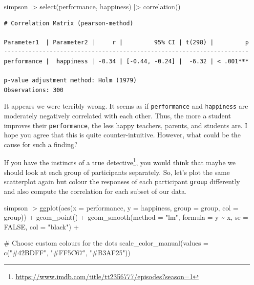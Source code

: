 \documentclass[
  letterpaper,
]{krantz}
\makeatletter
\newenvironment{Shaded}{\begin{snugshade}}{\end{snugshade}}
\newcommand{\AttributeTok}[1]{\textcolor[rgb]{0.40,0.45,0.13}{#1}}
\newcommand{\CommentTok}[1]{\textcolor[rgb]{0.37,0.37,0.37}{#1}}
\newcommand{\ConstantTok}[1]{\textcolor[rgb]{0.56,0.35,0.01}{#1}}
\newcommand{\FunctionTok}[1]{\textcolor[rgb]{0.28,0.35,0.67}{#1}}
\newcommand{\NormalTok}[1]{\textcolor[rgb]{0.00,0.23,0.31}{#1}}
\newcommand{\SpecialCharTok}[1]{\textcolor[rgb]{0.37,0.37,0.37}{#1}}
\newcommand{\StringTok}[1]{\textcolor[rgb]{0.13,0.47,0.30}{#1}}
\renewcommand{\href}[2]{#2\footnote{\url{#1}}}
\newenvironment{kframe}{%
\medskip{}
\setlength{\fboxsep}{.8em}
 \def\at@end@of@kframe{}%
 \ifinner\ifhmode%
  \def\at@end@of@kframe{\end{minipage}}%
  \begin{minipage}{\columnwidth}%
 \fi\fi%
 \def\FrameCommand##1{\hskip\@totalleftmargin \hskip-\fboxsep
 \colorbox{shadecolor}{##1}\hskip-\fboxsep
     \hskip-\linewidth \hskip-\@totalleftmargin \hskip\columnwidth}%
 \MakeFramed {\advance\hsize-\width
   \@totalleftmargin\z@ \linewidth\hsize
   \@setminipage}}%
 {\par\unskip\endMakeFramed%
 \at@end@of@kframe}
\renewenvironment{Shaded}{\begin{kframe}}{\end{kframe}}
\makeatother
\begin{document}
\begin{Shaded}
\begin{Highlighting}[]
\NormalTok{simpson }\SpecialCharTok{|\textgreater{}}
  \FunctionTok{select}\NormalTok{(performance, happiness) }\SpecialCharTok{|\textgreater{}}
  \FunctionTok{correlation}\NormalTok{()}
\end{Highlighting}
\end{Shaded}

\begin{verbatim}
# Correlation Matrix (pearson-method)

Parameter1  | Parameter2 |     r |         95% CI | t(298) |         p
----------------------------------------------------------------------
performance |  happiness | -0.34 | [-0.44, -0.24] |  -6.32 | < .001***

p-value adjustment method: Holm (1979)
Observations: 300
\end{verbatim}

It appears we were terribly wrong. It seems as if \texttt{performance}
and \texttt{happiness} are moderately negatively correlated with each
other. Thus, the more a student improves their \texttt{performance}, the
less happy teachers, parents, and students are. I hope you agree that
this is quite counter-intuitive. However, what could be the cause for
such a finding?

If you have the instincts of a
\href{https://www.imdb.com/title/tt2356777/episodes?season=1}{true
detective}, you would think that maybe we should look at each group of
participants separately. So, let's plot the same scatterplot again but
colour the responses of each participant \texttt{group} differently and
also compute the correlation for each subset of our data.

\begin{Shaded}
\begin{Highlighting}[]
\NormalTok{simpson }\SpecialCharTok{|\textgreater{}}
  \FunctionTok{ggplot}\NormalTok{(}\FunctionTok{aes}\NormalTok{(}\AttributeTok{x =}\NormalTok{ performance,}
             \AttributeTok{y =}\NormalTok{ happiness,}
             \AttributeTok{group =}\NormalTok{ group,}
             \AttributeTok{col =}\NormalTok{ group)) }\SpecialCharTok{+}
  \FunctionTok{geom\_point}\NormalTok{() }\SpecialCharTok{+}
  \FunctionTok{geom\_smooth}\NormalTok{(}\AttributeTok{method =} \StringTok{"lm"}\NormalTok{,}
              \AttributeTok{formula =}\NormalTok{ y }\SpecialCharTok{\textasciitilde{}}\NormalTok{ x,}
              \AttributeTok{se =} \ConstantTok{FALSE}\NormalTok{,}
              \AttributeTok{col =} \StringTok{"black"}\NormalTok{) }\SpecialCharTok{+}

  \CommentTok{\# Choose custom colours for the dots}
  \FunctionTok{scale\_color\_manual}\NormalTok{(}\AttributeTok{values =} \FunctionTok{c}\NormalTok{(}\StringTok{"\#42BDFF"}\NormalTok{, }\StringTok{"\#FF5C67"}\NormalTok{, }\StringTok{"\#B3AF25"}\NormalTok{))}
\end{Highlighting}
\end{Shaded}
\end{document}
